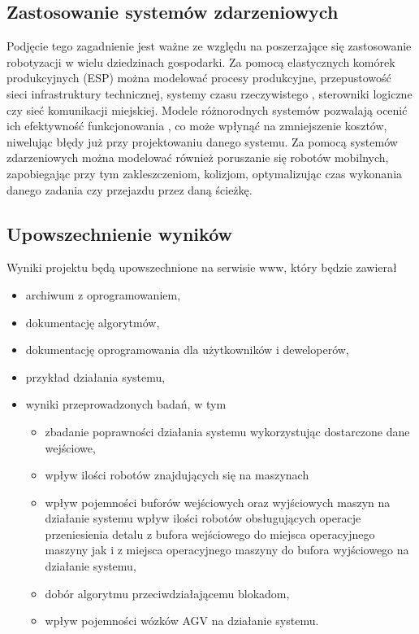 \documentclass[10pt, a4paper]{article}
\begin{document}
\subsection{Zastosowanie systemów zdarzeniowych}
Podjęcie tego zagadnienie jest ważne ze względu na poszerzające się zastosowanie robotyzacji w wielu dziedzinach gospodarki. Za pomocą elastycznych komórek produkcyjnych (ESP) można modelować procesy produkcyjne, przepustowość sieci infrastruktury technicznej, systemy czasu rzeczywistego  \cite{scr} , sterowniki logiczne \cite{sl} czy sieć komunikacji miejskiej. Modele różnorodnych systemów pozwalają ocenić ich efektywność funkcjonowania \cite{mucha}, co może wpłynąć na zmniejszenie kosztów, niwelując błędy już przy projektowaniu danego systemu. Za pomocą systemów zdarzeniowych można modelować również poruszanie się robotów mobilnych, zapobiegając przy tym zakleszczeniom, kolizjom, optymalizując czas wykonania danego zadania czy przejazdu przez daną ścieżkę.

\subsection{Upowszechnienie wyników}

Wyniki projektu będą upowszechnione na serwisie www, który będzie zawierał
\begin{itemize}
\item archiwum z oprogramowaniem,
\item dokumentację algorytmów,
\item dokumentację oprogramowania dla użytkowników i deweloperów,
\item przykład działania systemu,
\item wyniki przeprowadzonych badań, w tym
\begin{itemize}
\item zbadanie poprawności działania systemu wykorzystując dostarczone dane wejściowe,
\item wpływ ilości robotów znajdujących się na maszynach
\item wpływ pojemności buforów wejściowych oraz wyjściowych maszyn na działanie systemu wpływ ilości robotów obsługujących operacje przeniesienia detalu z bufora wejściowego do miejsca operacyjnego maszyny jak i z miejsca operacyjnego maszyny do bufora wyjściowego na działanie systemu,
\item dobór algorytmu przeciwdziałającemu blokadom,
\item wpływ pojemności wózków AGV na działanie systemu.
\end{itemize}
\end{itemize}
\end{document}
